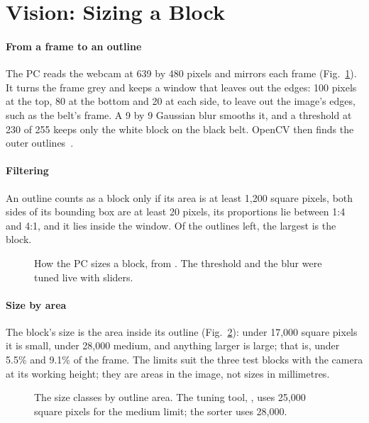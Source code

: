 \documentclass[11pt]{article}
\begin{document}
\section{Vision: Sizing a Block}
\label{sec:vision}

\paragraph{From a frame to an outline} The PC reads the webcam at 639 by 480 pixels and mirrors each frame (Fig.~\ref{fig:vision}). It turns the frame grey and keeps a window that leaves out the edges: 100 pixels at the top, 80 at the bottom and 20 at each side, to leave out the image's edges, such as the belt's frame. A 9 by 9 Gaussian blur smooths it, and a threshold at 230 of 255 keeps only the white block on the black belt. OpenCV then finds the outer outlines~\cite{suzuki1985contours}.

\paragraph{Filtering} An outline counts as a block only if its area is at least 1,200 square pixels, both sides of its bounding box are at least 20 pixels, its proportions lie between 1:4 and 4:1, and it lies inside the window. Of the outlines left, the largest is the block.

\begin{figure}[htbp]
  \centering
  \caption{How the PC sizes a block, from . The threshold and the blur were tuned live with sliders.}
  \label{fig:vision}
\end{figure}

\paragraph{Size by area} The block's size is the area inside its outline (Fig.~\ref{fig:bands}): under 17,000 square pixels it is small, under 28,000 medium, and anything larger is large; that is, under 5.5\% and 9.1\% of the frame. The limits suit the three test blocks with the camera at its working height; they are areas in the image, not sizes in millimetres.

\begin{figure}[htbp]
  \centering
  \caption{The size classes by outline area. The tuning tool, , uses 25,000 square pixels for the medium limit; the sorter uses 28,000.}
  \label{fig:bands}
\end{figure}
\end{document}
